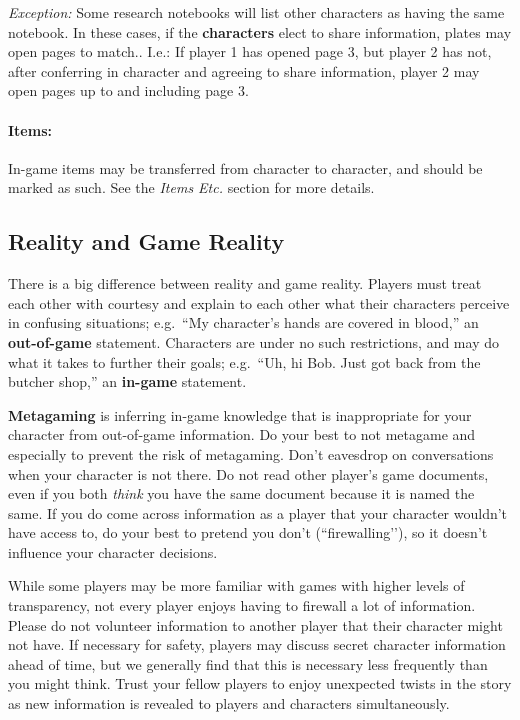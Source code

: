 \documentclass[sheet]{GL2020}
\begin{document}
\emph{Exception:} Some research notebooks will list other characters as having the same notebook. In these cases, if the \textbf{characters} elect to share information, plates may open pages to match.. I.e.: If player 1 has opened page 3, but player 2 has not, after conferring in character and agreeing to share information, player 2 may open pages up to and including page 3.

\paragraph{Items:} In-game items may be transferred from character to character, and should be marked as such.  See the \emph{Items Etc.} section for more details.


\clearpage
\subsection{Reality and Game Reality}

There is a big difference between reality and game reality.  Players must treat each other with courtesy and explain to each other what their characters perceive in confusing situations; e.g.\ ``My character's hands are covered in blood,'' an {\bf out-of-game} statement.  Characters are under no such restrictions, and may do what it takes to further their goals; e.g.\ ``Uh, hi Bob. Just got back from the butcher shop,'' an {\bf in-game} statement.

{\bf Metagaming} is inferring in-game knowledge that is inappropriate for your character from out-of-game information.  Do your best to not metagame and especially to prevent the risk of metagaming. Don’t eavesdrop on conversations when your character is not there. Do not read other player’s game documents, even if you both \emph{think} you have the same document because it is named the same. If you do come across information as a player that your character wouldn’t have access to, do your best to pretend you don’t (``firewalling’’), so it doesn’t influence your character decisions.

While some players may be more familiar with games with higher levels of transparency, not every player enjoys having to firewall a lot of information. Please do not volunteer information to another player that their character might not have. If necessary for safety, players may discuss secret character information ahead of time, but we generally find that this is necessary less frequently than you might think. Trust your fellow players to enjoy unexpected twists in the story as new information is revealed to players and characters simultaneously.
\end{document}
